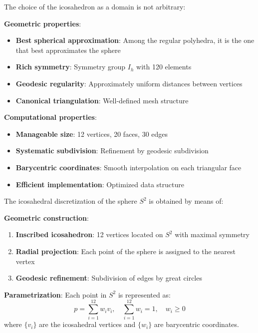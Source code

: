 \begin{example}
The choice of the icosahedron as a domain is not arbitrary:

\textbf{Geometric properties}:
\begin{itemize}
    \item \textbf{Best spherical approximation}: Among the regular polyhedra, it is the one that best approximates the sphere
    \item \textbf{Rich symmetry}: Symmetry group $I_h$ with 120 elements
    \item \textbf{Geodesic regularity}: Approximately uniform distances between vertices
    \item \textbf{Canonical triangulation}: Well-defined mesh structure
\end{itemize}

\textbf{Computational properties}:
\begin{itemize}
    \item \textbf{Manageable size}: 12 vertices, 20 faces, 30 edges
    \item \textbf{Systematic subdivision}: Refinement by geodesic subdivision
    \item \textbf{Barycentric coordinates}: Smooth interpolation on each triangular face
    \item \textbf{Efficient implementation}: Optimized data structure
\end{itemize}
\end{example}

\begin{definition}\label{def:discretizacion_icosaedrica}
The icosahedral discretization of the sphere $S^2$ is obtained by means of:

\textbf{Geometric construction}:
\begin{enumerate}
    \item \textbf{Inscribed icosahedron}: 12 vertices located on $S^2$ with maximal symmetry
    \item \textbf{Radial projection}: Each point of the sphere is assigned to the nearest vertex
    \item \textbf{Geodesic refinement}: Subdivision of edges by great circles
\end{enumerate}

\textbf{Parametrization}: Each point in $S^2$ is represented as:
\begin{equation}
p = \sum_{i=1}^{12} w_i v_i, \quad \sum_{i=1}^{12} w_i = 1, \quad w_i \geq 0
\end{equation}
where $\{v_i\}$ are the icosahedral vertices and $\{w_i\}$ are barycentric coordinates.
\end{definition}

